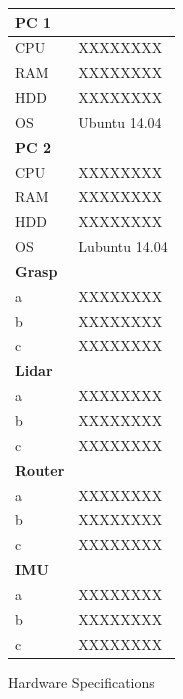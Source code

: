 \begin{figure}[htbp]
\begin{minipage}{0.45\textwidth}
		\label{fig:youBot}
	\end{minipage}
	\hfill
	\begin{minipage}{0.45\textwidth}
		\renewcommand*\figurename{Tab.}
		\setcounter{figure}{0}
		\centering
		\caption{Hardware Specifications}
		\begin{tabular}{ | p{2cm} | p{3cm} | }
			\hline
			\bfseries{PC 1} &  \\
			\hline
			CPU & XXXXXXXX \\
			RAM & XXXXXXXX \\
			HDD & XXXXXXXX \\
			OS & Ubuntu 14.04 \\
			\hline \hline
			\bfseries{PC 2} &  \\
			\hline
			CPU & XXXXXXXX \\
			RAM & XXXXXXXX \\
			HDD & XXXXXXXX \\
			OS & Lubuntu 14.04 \\
			\hline \hline
			\bfseries{Grasp} &  \\
			\hline
			a & XXXXXXXX \\
			b & XXXXXXXX \\
			c & XXXXXXXX \\
			\hline \hline
			\bfseries{Lidar} &  \\
			\hline
			a & XXXXXXXX \\
			b & XXXXXXXX \\
			c & XXXXXXXX \\
			\hline \hline
			\bfseries{Router} &  \\
			\hline
			a & XXXXXXXX \\
			b & XXXXXXXX \\
			c & XXXXXXXX \\
			\hline \hline
			\bfseries{IMU} &  \\
			\hline
			a & XXXXXXXX \\
			b & XXXXXXXX \\
			c & XXXXXXXX \\
			\hline
		\end{tabular}
		\label{tab:hw}
	\end{minipage}
\end{figure}

\setcounter{figure}{1}

